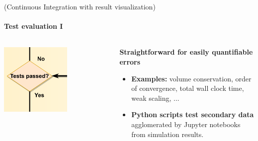 \begin{frame}{(Continuous Integration with result visualization)} 
    \framesubtitle{Test evaluation I}

    \vfill

    \begin{columns}
        \begin{column}[c]{0.4\textwidth}
            \centering
            \includegraphics[width=0.6\textwidth]{figures/test-evaluation.png}
        \end{column}
        \begin{column}[c]{0.6\textwidth}
            \textbf{Straightforward for easily quantifiable errors}
            \begin{itemize}
                \item \textbf{Examples:} volume conservation, order of convergence, total wall clock time, weak scaling, ...
                \item \textbf{Python scripts test secondary data} agglomerated by Jupyter notebooks from simulation results.
            \end{itemize}
        \end{column}
    \end{columns}
\end{frame}

